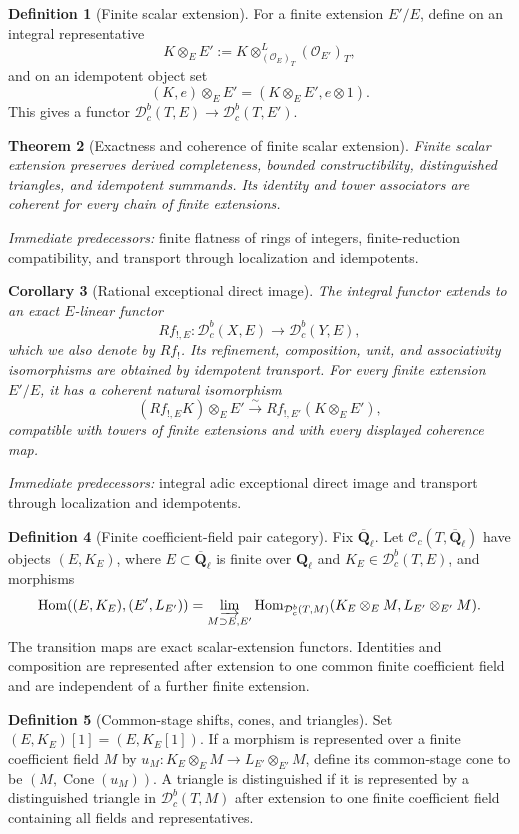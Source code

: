 \documentclass[10pt]{article}
\newtheorem{theorem}{Theorem}[section]
\newtheorem{corollary}[theorem]{Corollary}
\theoremstyle{definition}
\newtheorem{definition}[theorem]{Definition}
\newcommand{\Ql}{\mathbf Q_\ell}
\newcommand{\Qlb}{\overline{\mathbf Q}_\ell}
\newcommand{\Dbc}{\mathcal D^b_c}
\newcommand{\Hom}{\operatorname{Hom}}
\newcommand{\pred}[1]{\par\smallskip\begingroup\footnotesize\raggedright
\emph{Immediate predecessors:} #1.\par\endgroup}
\begin{document}
\begin{definition}[Finite scalar extension]
For a finite extension \(E'/E\), define on an integral representative
\[
 K\otimes_EE':=
 K\otimes^L_{(\mathcal O_E)_T}(\mathcal O_{E'})_T,
\]
and on an idempotent object set
\[
 (K,e)\otimes_EE'=(K\otimes_EE',e\otimes1).
\]
This gives a functor \(\Dbc(T,E)\to\Dbc(T,E')\).
\end{definition}

\begin{theorem}[Exactness and coherence of finite scalar extension]
Finite scalar extension preserves derived completeness, bounded
constructibility, distinguished triangles, and idempotent summands.  Its
identity and tower associators are coherent for every chain of finite
extensions.
\end{theorem}
\pred{finite flatness of rings of integers, finite-reduction compatibility, and transport through localization and idempotents}

\begin{corollary}[Rational exceptional direct image]
The integral functor extends to an exact \(E\)-linear functor
\[
 Rf_{!,E}: \Dbc(X,E)\longrightarrow\Dbc(Y,E),
\]
which we also denote by \(Rf_!\).  Its refinement, composition, unit, and
associativity isomorphisms are obtained by idempotent transport.  For every
finite extension \(E'/E\), it has a
coherent natural isomorphism
\[
 (Rf_{!,E}K)\otimes_EE'\xrightarrow{\sim}
 Rf_{!,E'}(K\otimes_EE'),
\]
compatible with towers of finite extensions and with every displayed
coherence map.
\end{corollary}
\pred{integral adic exceptional direct image and transport through localization and idempotents}

\begin{definition}[Finite coefficient-field pair category]
Fix \(\Qlb\).  Let \(\mathcal C_c(T,\Qlb)\) have objects
\((E,K_E)\), where \(E\subset\Qlb\) is finite over \(\Ql\) and
\(K_E\in\Dbc(T,E)\), and morphisms
\[
 \Hom((E,K_E),(E',L_{E'}))=
 \varinjlim_{M\supset E,E'}
 \Hom_{\Dbc(T,M)}
 (K_E\otimes_EM,L_{E'}\otimes_{E'}M).
\]
The transition maps are exact scalar-extension functors.  Identities and
composition are represented after extension to one common finite coefficient field
and are independent of a further finite extension.
\end{definition}

\begin{definition}[Common-stage shifts, cones, and triangles]
Set \((E,K_E)[1]=(E,K_E[1])\).  If a morphism is represented over a
finite coefficient field \(M\) by
\(u_M:K_E\otimes_EM\to L_{E'}\otimes_{E'}M\), define its common-stage
cone to be \((M,\operatorname{Cone}(u_M))\).  A triangle is distinguished
if it is represented by a distinguished triangle in \(\Dbc(T,M)\) after
extension to one finite coefficient field containing all fields and representatives.
\end{definition}
\end{document}
